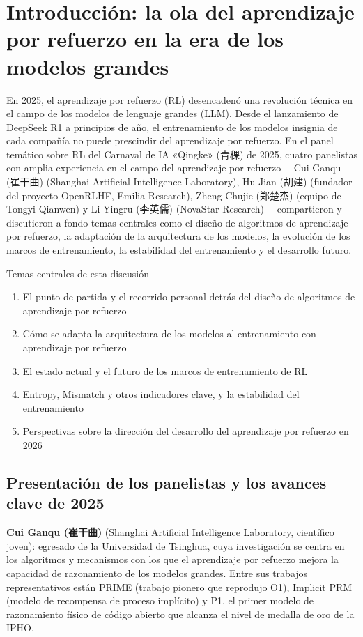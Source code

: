 \section{Introducción: la ola del aprendizaje por refuerzo en la era de los modelos grandes}

En 2025, el aprendizaje por refuerzo (RL) desencadenó una revolución técnica en el campo de los modelos de lenguaje grandes (LLM). Desde el lanzamiento de DeepSeek R1 a principios de año, el entrenamiento de los modelos insignia de cada compañía no puede prescindir del aprendizaje por refuerzo. En el panel temático sobre RL del Carnaval de IA «Qingke» (青稞) de 2025, cuatro panelistas con amplia experiencia en el campo del aprendizaje por refuerzo —Cui Ganqu (崔干曲) (Shanghai Artificial Intelligence Laboratory), Hu Jian (胡建) (fundador del proyecto OpenRLHF, Emilia Research), Zheng Chujie (郑楚杰) (equipo de Tongyi Qianwen) y Li Yingru (李英儒) (NovaStar Research)— compartieron y discutieron a fondo temas centrales como el diseño de algoritmos de aprendizaje por refuerzo, la adaptación de la arquitectura de los modelos, la evolución de los marcos de entrenamiento, la estabilidad del entrenamiento y el desarrollo futuro.

\begin{importantbox}{Temas centrales de esta discusión}
\begin{enumerate}
    \item El punto de partida y el recorrido personal detrás del diseño de algoritmos de aprendizaje por refuerzo
    \item Cómo se adapta la arquitectura de los modelos al entrenamiento con aprendizaje por refuerzo
    \item El estado actual y el futuro de los marcos de entrenamiento de RL
    \item Entropy, Mismatch y otros indicadores clave, y la estabilidad del entrenamiento
    \item Perspectivas sobre la dirección del desarrollo del aprendizaje por refuerzo en 2026
\end{enumerate}
\end{importantbox}

\subsection{Presentación de los panelistas y los avances clave de 2025}

\textbf{Cui Ganqu (崔干曲)} (Shanghai Artificial Intelligence Laboratory, científico joven): egresado de la Universidad de Tsinghua, cuya investigación se centra en los algoritmos y mecanismos con los que el aprendizaje por refuerzo mejora la capacidad de razonamiento de los modelos grandes. Entre sus trabajos representativos están PRIME (trabajo pionero que reprodujo O1), Implicit PRM (modelo de recompensa de proceso implícito) y P1, el primer modelo de razonamiento físico de código abierto que alcanza el nivel de medalla de oro de la IPHO.

